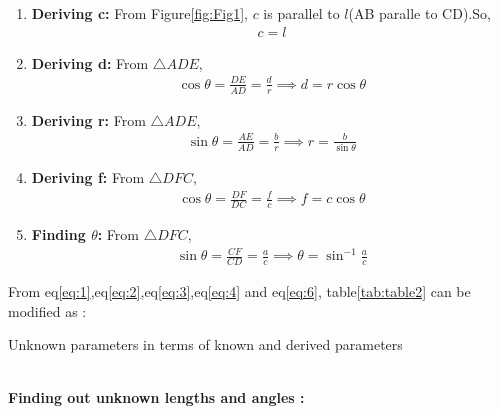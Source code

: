 \documentclass{article}
\begin{document}
\begin{enumerate}
	\item \textbf{Deriving c:}
		From Figure\ref{fig:Fig1}, $c$ is  parallel to $l$(AB paralle to CD).So,
		\begin{align}
			c = l
			\label{eq:1}
		\end{align}
	\item \textbf{Deriving d:}
		From $\triangle{ADE}$,
		\begin{align}
			\cos{\theta} = \frac{DE}{AD} = \frac{d}{r}
			\implies d = r\cos{\theta}
			\label{eq:2}
		\end{align}
	\item \textbf{Deriving r:}
		From $\triangle{ADE}$,
		\begin{align}
			\sin{\theta} = \frac{AE}{AD} = \frac{b}{r}
			\implies r = \frac{b}{\sin{\theta}}
			\label{eq:3}
		\end{align}
	\item \textbf{Deriving f:}
		From $\triangle{DFC}$,
		\begin{align}
			\cos{\theta} = \frac{DF}{DC} = \frac{f}{c}
			\implies f = c\cos{\theta}
			\label{eq:4}
		\end{align}
	\item \textbf{Finding $\theta$:}
		From $\triangle{DFC}$,
		\begin{align}
			\sin{\theta} = \frac{CF}{CD} = \frac{a}{c}
			\implies \theta = \sin^{-1}\frac{a}{c}
			\label{eq:6}
		\end{align}
\end{enumerate}
From eq\ref{eq:1},eq\ref{eq:2},eq\ref{eq:3},eq\ref{eq:4} and eq\ref{eq:6}, table\ref{tab:table2} can be modified as :\\
\begin{table}[H]
	\centering
	
	\caption{Unknown parameters in terms of known and derived parameters}
	\label{tab:table4}
\end{table}\\
\textbf{Finding out unknown lengths and angles :}\\
\end{document}
